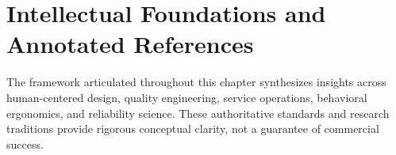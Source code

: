 
\section*{Intellectual Foundations and Annotated References}

The framework articulated throughout this chapter synthesizes insights across human-centered design, quality engineering, service operations, behavioral ergonomics, and reliability science. These authoritative standards and research traditions provide rigorous conceptual clarity, not a guarantee of commercial success.

